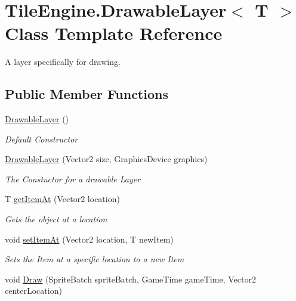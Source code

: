 \hypertarget{class_tile_engine_1_1_drawable_layer_3_01_t_01_4}{\section{Tile\-Engine.\-Drawable\-Layer$<$ T $>$ Class Template Reference}
\label{class_tile_engine_1_1_drawable_layer_3_01_t_01_4}
}


A layer specifically for drawing.  


\subsection*{Public Member Functions}
\begin{DoxyCompactItemize}
\item 
\hyperlink{class_tile_engine_1_1_drawable_layer_3_01_t_01_4_a75c68a1120810d78da78deb7e1842d6d}{Drawable\-Layer} ()
\begin{DoxyCompactList}\small\item\em Default Constructor \end{DoxyCompactList}\item 
\hyperlink{class_tile_engine_1_1_drawable_layer_3_01_t_01_4_afc8431acf52a3ccf8f0ba47688a26249}{Drawable\-Layer} (Vector2 size, Graphics\-Device graphics)
\begin{DoxyCompactList}\small\item\em The Constuctor for a drawable Layer \end{DoxyCompactList}\item 
T \hyperlink{class_tile_engine_1_1_drawable_layer_3_01_t_01_4_af6de54987654c082316ef350f02af005}{get\-Item\-At} (Vector2 location)
\begin{DoxyCompactList}\small\item\em Gets the object at a location \end{DoxyCompactList}\item 
void \hyperlink{class_tile_engine_1_1_drawable_layer_3_01_t_01_4_a9743f584942c1445ab21fe4ae131c94e}{set\-Item\-At} (Vector2 location, T new\-Item)
\begin{DoxyCompactList}\small\item\em Sets the Item at a specific location to a new Item \end{DoxyCompactList}\item 
void \hyperlink{class_tile_engine_1_1_drawable_layer_3_01_t_01_4_a4c1c5d0a76e1b61955e13196efe28e30}{Draw} (Sprite\-Batch sprite\-Batch, Game\-Time game\-Time, Vector2 center\-Location)

\end{DoxyCompactItemize}
